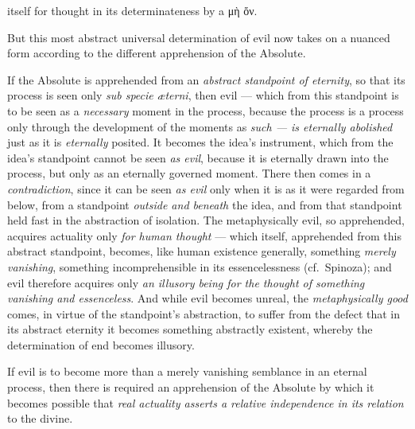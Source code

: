 \documentclass[12pt,a4paper]{book}
\begin{document}
itself for thought in its determinateness by a μὴ ὄν.

But this most abstract universal determination of evil now takes on a nuanced
form according to the different apprehension of the Absolute.

If the Absolute is apprehended from an \emph{abstract standpoint of eternity},
so that its process is seen only \emph{\textit{sub specie}}
\emph{\textit{æterni}}, then evil --- which from this standpoint is to be seen
as a \emph{necessary} moment in the process, because the process is a process
only through the development of the moments as \emph{such --- is eternally
abolished} just as it is \emph{eternally} posited. It becomes the idea's
instrument, which from the idea's standpoint cannot be seen \emph{as evil},
because it is eternally drawn into the process, but only as an eternally
governed moment. There then comes in a \emph{contradiction}, since it can be
seen \emph{as evil} only when it is as it were regarded from below, from a
standpoint \emph{outside and beneath} the idea, and from that standpoint held
fast in the abstraction of isolation. The metaphysically evil, so apprehended,
acquires actuality only \emph{for human thought} --- which itself, apprehended
from this abstract standpoint, becomes, like human existence generally,
something \emph{merely vanishing}, something incomprehensible in its
essencelessness (cf.\ Spinoza); and evil therefore acquires only \emph{an
illusory being for the thought of something vanishing and essenceless}. And
while evil becomes unreal, the \emph{metaphysically good} comes, in virtue of
the standpoint's abstraction, to suffer from the defect that in its abstract
eternity it becomes something abstractly existent, whereby the determination of
end becomes illusory.

If evil is to become more than a merely vanishing semblance in an eternal
process, then there is required an apprehension of the Absolute by which it
becomes possible that \emph{real actuality asserts a relative independence in
its relation} to the divine.
\end{document}
